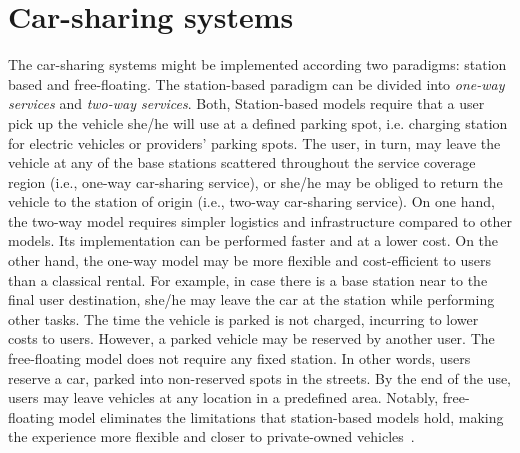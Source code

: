 \section{Car-sharing systems} 
\label{sec:4_2_carsharing}


The car-sharing systems might be implemented according two paradigms: station based and  free-floating. The station-based paradigm can be divided into \textit{one-way services} and \textit{two-way services}. Both, Station-based models require that a user pick up the vehicle she/he will use at a defined parking spot, i.e. charging station for electric vehicles or providers' parking spots. The user, in turn, may leave the vehicle at any of the base stations scattered throughout the service coverage region (i.e., one-way car-sharing service), or she/he may be obliged to return the vehicle to the station of origin (i.e., two-way car-sharing service). On one hand, the two-way model requires simpler logistics and infrastructure compared to other models. Its implementation can be performed faster and at a lower cost. 
On the other hand, the one-way model may be more flexible and cost-efficient to users than a classical rental. For example, in case there is a base station near to the final user destination, she/he may leave the car at the station while performing other tasks. The time the vehicle is parked is not charged, incurring to lower costs to users. However, a parked vehicle may be reserved by another user. 
The free-floating model does not require any fixed station. In other words, users reserve a car, parked into non-reserved spots in the streets. By the end of the use, users may leave vehicles at any location in a predefined area. Notably, free-floating model eliminates the limitations that station-based models hold, making the experience more flexible and closer to private-owned vehicles~\cite{ciari2014modeling}.

